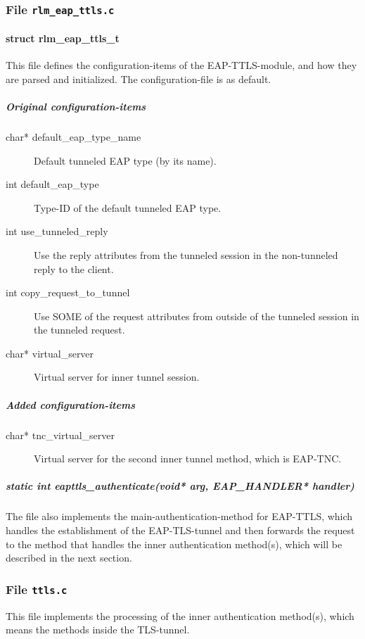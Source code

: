 \subsubsection{File \texttt{rlm\_eap\_ttls.c}}
\paragraph{struct rlm\_eap\_ttls\_t}
This file defines the configuration-items of the EAP-TTLS-module, and how they are parsed and initialized.
The configuration-file is  as default.

\subparagraph{Original configuration-items}
\begin{description}
	\item[char* default\_eap\_type\_name] Default tunneled EAP type (by its name).
	\item[int default\_eap\_type] Type-ID of the default tunneled EAP type.
	\item[int use\_tunneled\_reply] Use the reply attributes from the tunneled session in the non-tunneled reply to the client.
	\item[int copy\_request\_to\_tunnel] Use SOME of the request attributes from outside of the tunneled session in the tunneled request.
	\item[char* virtual\_server] Virtual server for inner tunnel session.
\end{description}

\subparagraph{Added configuration-items}
\begin{description}
	\item[char* tnc\_virtual\_server] Virtual server for the second inner tunnel method, which is EAP-TNC.
\end{description}
	
\subparagraph{static int eapttls\_authenticate(void* arg, EAP\_HANDLER* handler)}
The file  also implements the main-authentication-method for EAP-TTLS,
which handles the establishment of the EAP-TLS-tunnel and then forwards the request to the method that handles the inner authentication method(s), which will be described in the next section.

\subsubsection{File \texttt{ttls.c}}
This file implements the processing of the inner authentication method(s), which means the methods inside the TLS-tunnel.

